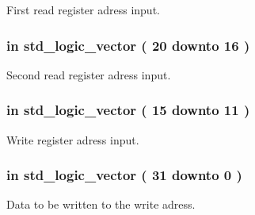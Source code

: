 \-First read register adress input. 

\hypertarget{classregister__file_a5f618c16ce27d5d1fbb470a067cd0ddf}{
\subsubsection[{\-Read\-\_\-reg\-\_\-2}]{ {\bfseries in } {\bfseries std\-\_\-logic\-\_\-vector (   20    downto    16  ) } }}\label{classregister__file_a5f618c16ce27d5d1fbb470a067cd0ddf}


\-Second read register adress input. 

\hypertarget{classregister__file_a2fed508e2f436c760a1584fb86fc8196}{
\subsubsection[{\-Write\-\_\-reg}]{ {\bfseries in } {\bfseries std\-\_\-logic\-\_\-vector (   15    downto    11  ) } }}\label{classregister__file_a2fed508e2f436c760a1584fb86fc8196}


\-Write register adress input. 

\hypertarget{classregister__file_aa5f5791f55f67b340ebfeed6091de3ef}{
\subsubsection[{\-Write\-\_\-data}]{ {\bfseries in } {\bfseries std\-\_\-logic\-\_\-vector (   31    downto    0  ) } }}\label{classregister__file_aa5f5791f55f67b340ebfeed6091de3ef}


\-Data to be written to the write adress. 

